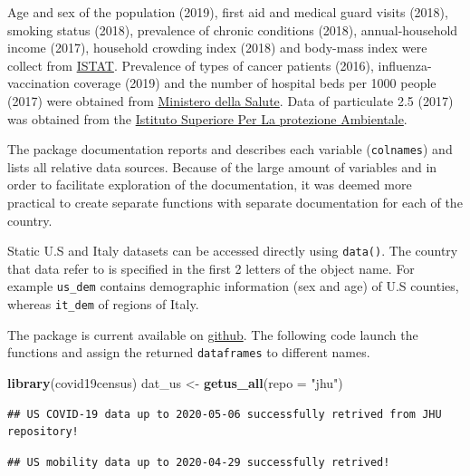 \documentclass[12pt,halfline,a4paper,]{ouparticle}
\newenvironment{Shaded}{\begin{snugshade}}{\end{snugshade}}
\newcommand{\DataTypeTok}[1]{\textcolor[rgb]{0.13,0.29,0.53}{#1}}
\newcommand{\KeywordTok}[1]{\textcolor[rgb]{0.13,0.29,0.53}{\textbf{#1}}}
\newcommand{\NormalTok}[1]{#1}
\newcommand{\StringTok}[1]{\textcolor[rgb]{0.31,0.60,0.02}{#1}}
\begin{document}
Age and sex of the population (2019), first aid and medical guard visits
(2018), smoking status (2018), prevalence of chronic conditions (2018),
annual-household income (2017), household crowding index (2018) and
body-mass index were collect from
\href{http://dati.istat.it/?lang=en}{ISTAT}. Prevalence of types of
cancer patients (2016), influenza-vaccination coverage (2019) and the
number of hospital beds per 1000 people (2017) were obtained from
\href{http://www.dati.salute.gov.it/}{Ministero della Salute}. Data of
particulate 2.5 (2017) was obtained from the
\href{https://annuario.isprambiente.it/pon/basic/14}{Istituto Superiore
Per La protezione Ambientale}.

The package documentation reports and describes each variable
(\texttt{colnames}) and lists all relative data sources. Because of the
large amount of variables and in order to facilitate exploration of the
documentation, it was deemed more practical to create separate functions
with separate documentation for each of the country.

Static U.S and Italy datasets can be accessed directly using
\texttt{data()}. The country that data refer to is specified in the
first 2 letters of the object name. For example \texttt{us\_dem}
contains demographic information (sex and age) of U.S counties, whereas
\texttt{it\_dem} of regions of Italy.

The package is current available on
\href{https://github.com/c1au6i0/covid19census}{github}. The following
code launch the functions and assign the returned \texttt{dataframes} to
different names.

\bigskip

\begin{Shaded}
\begin{Highlighting}[]
\KeywordTok{library}\NormalTok{(covid19census)}
\NormalTok{dat_us <-}\StringTok{ }\KeywordTok{getus_all}\NormalTok{(}\DataTypeTok{repo =} \StringTok{"jhu"}\NormalTok{)}
\end{Highlighting}
\end{Shaded}

\begin{verbatim}
## US COVID-19 data up to 2020-05-06 successfully retrived from JHU repository!
\end{verbatim}

\begin{verbatim}
## US mobility data up to 2020-04-29 successfully retrived!
\end{verbatim}
\end{document}
